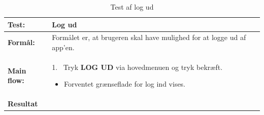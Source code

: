 \begin{table} [H]
	\centering
  \begin{tabular}{ | l | p{13cm} |} \hline
    \textbf{Test:} & Log ud \\ \hline
  \textbf{Formål:} & Formålet er, at brugeren skal have mulighed for at logge ud af app’en.
 \\ \hline
 	\textbf{Main flow:} & 1.~ Tryk \textbf{LOG UD} via hovedmenuen og tryk bekræft.
 	\begin{itemize} [label={\checkmark}]
 	\item Forventet grænseflade for log ind vises.
 	\end{itemize}	
\\ \hline
\textbf{Resultat} &\\ \hline
   \end{tabular}
   \caption{Test af log ud}
    \label{tab:testLogud}
\end{table}





